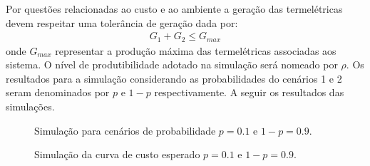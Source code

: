 Por quest\~oes relacionadas ao custo e ao ambiente a gera\c c\~ao das termel\'etricas devem respeitar uma toler\^ancia de
gera\c c\~ao dada por:
\begin{align*}
	G_1 + G_2 \leq G_{max}
\end{align*}
onde $G_{max}$ representar a produ\c c\~ao m\'axima das termel\'etricas associadas aos sistema. O n\'ivel de
produtibilidade adotado na simula\c c\~ao ser\'a nomeado por $\rho$. 
Os resultados para a
simula\c c\~ao considerando as probabilidades do cen\'arios 1 e 2 seram denominados  por $p$ e $ 1 -
p$ respectivamente. A seguir os resultados das simula\c c\~oes.

\begin{figure}[!ht]
	\centering
	\caption{Simula\c c\~ao para cen\'arios de probabilidade $p = 0.1$ e $1 - p = 0.9$.}
	\label{gf1}
\end{figure}

\begin{figure}
	\centering
	\caption{Simula\c c\~ao da curva de custo esperado $p = 0.1$ e $1 - p = 0.9$.}
	\label{cu1}
\end{figure}

